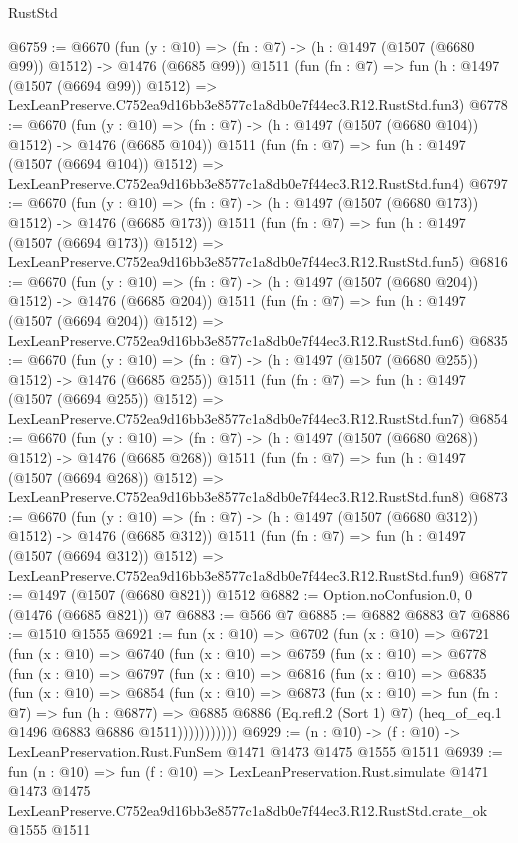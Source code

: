 \begin{lexlean}{RustStd}
\begin{coremodule}
@6759 := @6670
    (fun (y : @10) => (fn : @7) -> (h : @1497 (@1507 (@6680 @99)) @1512) -> @1476 (@6685 @99))
    @1511
    (fun (fn : @7) =>
    fun (h : @1497 (@1507 (@6694 @99)) @1512) =>
    LexLeanPreserve.C752ea9d16bb3e8577c1a8db0e7f44ec3.R12.RustStd.fun3)
@6778 := @6670
    (fun (y : @10) => (fn : @7) -> (h : @1497 (@1507 (@6680 @104)) @1512) -> @1476 (@6685 @104))
    @1511
    (fun (fn : @7) =>
    fun (h : @1497 (@1507 (@6694 @104)) @1512) =>
    LexLeanPreserve.C752ea9d16bb3e8577c1a8db0e7f44ec3.R12.RustStd.fun4)
@6797 := @6670
    (fun (y : @10) => (fn : @7) -> (h : @1497 (@1507 (@6680 @173)) @1512) -> @1476 (@6685 @173))
    @1511
    (fun (fn : @7) =>
    fun (h : @1497 (@1507 (@6694 @173)) @1512) =>
    LexLeanPreserve.C752ea9d16bb3e8577c1a8db0e7f44ec3.R12.RustStd.fun5)
@6816 := @6670
    (fun (y : @10) => (fn : @7) -> (h : @1497 (@1507 (@6680 @204)) @1512) -> @1476 (@6685 @204))
    @1511
    (fun (fn : @7) =>
    fun (h : @1497 (@1507 (@6694 @204)) @1512) =>
    LexLeanPreserve.C752ea9d16bb3e8577c1a8db0e7f44ec3.R12.RustStd.fun6)
@6835 := @6670
    (fun (y : @10) => (fn : @7) -> (h : @1497 (@1507 (@6680 @255)) @1512) -> @1476 (@6685 @255))
    @1511
    (fun (fn : @7) =>
    fun (h : @1497 (@1507 (@6694 @255)) @1512) =>
    LexLeanPreserve.C752ea9d16bb3e8577c1a8db0e7f44ec3.R12.RustStd.fun7)
@6854 := @6670
    (fun (y : @10) => (fn : @7) -> (h : @1497 (@1507 (@6680 @268)) @1512) -> @1476 (@6685 @268))
    @1511
    (fun (fn : @7) =>
    fun (h : @1497 (@1507 (@6694 @268)) @1512) =>
    LexLeanPreserve.C752ea9d16bb3e8577c1a8db0e7f44ec3.R12.RustStd.fun8)
@6873 := @6670
    (fun (y : @10) => (fn : @7) -> (h : @1497 (@1507 (@6680 @312)) @1512) -> @1476 (@6685 @312))
    @1511
    (fun (fn : @7) =>
    fun (h : @1497 (@1507 (@6694 @312)) @1512) =>
    LexLeanPreserve.C752ea9d16bb3e8577c1a8db0e7f44ec3.R12.RustStd.fun9)
@6877 := @1497 (@1507 (@6680 @821)) @1512
@6882 := Option.noConfusion.{0, 0} (@1476 (@6685 @821)) @7
@6883 := @566 @7
@6885 := @6882 @6883 @7
@6886 := @1510 @1555
@6921 := fun (x : @10) =>
  @6702
    (fun (x : @10) =>
    @6721
      (fun (x : @10) =>
      @6740
        (fun (x : @10) =>
        @6759
          (fun (x : @10) =>
          @6778
            (fun (x : @10) =>
            @6797
              (fun (x : @10) =>
              @6816
                (fun (x : @10) =>
                @6835
                  (fun (x : @10) =>
                  @6854
                    (fun (x : @10) =>
                    @6873
                      (fun (x : @10) =>
                      fun (fn : @7) =>
                      fun (h : @6877) =>
                      @6885
                        @6886
                        (Eq.refl.{2} (Sort 1) @7)
                        (heq_of_eq.{1} @1496 @6883 @6886 @1511)))))))))))
@6929 := (n : @10) -> (f : @10) -> LexLeanPreservation.Rust.FunSem @1471 @1473 @1475 @1555 @1511
@6939 := fun (n : @10) =>
  fun (f : @10) =>
  LexLeanPreservation.Rust.simulate
    @1471
    @1473
    @1475
    LexLeanPreserve.C752ea9d16bb3e8577c1a8db0e7f44ec3.R12.RustStd.crate_ok
    @1555
    @1511
\end{coremodule}
\end{lexlean}
